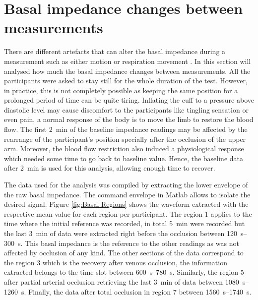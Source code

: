 \section{Basal impedance changes between measurements}
\label{senction basal 3}
There are different artefacts that can alter the basal impedance during a measurement such as either motion or respiration movement \cite{pandey2006cancellation, swanson1983errors, ansari2010impedance, rosell1995reduction}. In this section will analysed how much the basal impedance changes between measurements. All the participants were asked to stay still for the whole duration of the test. However, in practice, this is not completely possible as keeping the same position for a prolonged period of time can be quite tiring. Inflating the cuff to a pressure above diastolic level may cause discomfort to the participants like tingling sensation or even pain, a normal response of the body is to move the limb to restore the blood flow. The first \SI{2}{\minute} of the baseline impedance readings may be affected by the rearrange of the participant's position specially after the occlusion of the upper arm. Moreover, the blood flow restriction also induced a physiological response which needed some time to go back to baseline value. Hence, the baseline data after \SI{2}{\minute} is used for this analysis, allowing enough time to recover. 

The data used for the analysis was compiled by extracting the lower envelope of the raw basal impedance. The command envelope in Matlab \cite{MATLAB:2016} allows to isolate the desired signal. Figure \ref{fig:Basal Regions} shows the waveform extracted with the respective mean value for each region per participant. The region 1 applies to the time where the initial reference was recorded, in total \SI{5}{\minute} were recorded but the last \SI{3}{\minute} of data were extracted right before the occlusion between \SIrange{120}{300}{\second}. This basal impedance is the reference to the other readings as was not affected by occlusion of any kind. The other sections of the data correspond to the region 3 which is the recovery after venous occlusion, the information extracted belongs to the time slot between \SIrange{ 600}{780}{\second}.  Similarly, the region 5 after partial arterial occlusion retrieving the last \SI{3}{\minute} of data between \SIrange{1080}{1260}{\second}. Finally, the data after total occlusion in region 7 between \SIrange{1560}{1740}{\second}.

